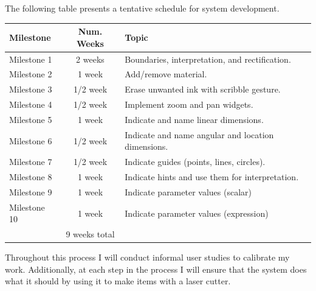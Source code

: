 \documentclass[12pt]{article}
\begin{document}
The following table presents a tentative schedule for system development.

\vspace{12pt}
\begin{tabular}{ | l | c | l | }
  \hline

  \textbf{Milestone} & \textbf{Num. Weeks} & \textbf{Topic} \\

  \hline \hline

  Milestone 1 & 2 weeks & Boundaries, interpretation, and rectification. \\
  
  Milestone 2 & 1 week & Add/remove material. \\

  Milestone 3 & 1/2 week & Erase unwanted ink with scribble gesture. \\

  Milestone 4 & 1/2 week & Implement zoom and pan widgets. \\ 

  Milestone 5 & 1 week & Indicate and name linear dimensions. \\

  Milestone 6 & 1/2 week & Indicate and name angular and location dimensions. \\

  Milestone 7 & 1/2 week & Indicate guides (points, lines, circles). \\ 

  Milestone 8 & 1 week & Indicate hints and use them for interpretation. \\ 

  Milestone 9 & 1 week & Indicate parameter values (scalar) \\ 

  Milestone 10 & 1 week & Indicate parameter values (expression) \\

  \hline
  
  & 9 weeks total & \\

  \hline

\end{tabular}
\vspace{12pt}

Throughout this process I will conduct informal user studies to
calibrate my work. Additionally, at each step in the process I will
ensure that the system does what it should by using it to make items
with a laser cutter. 
\end{document}
